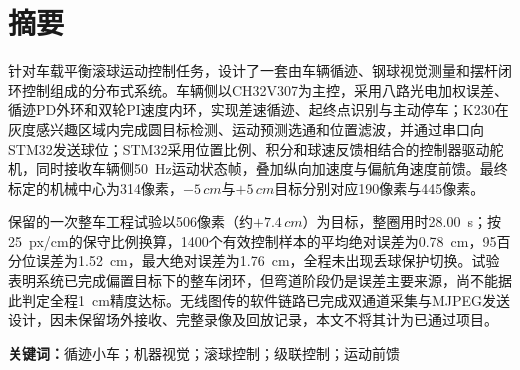 \section*{摘要}

\noindent
针对车载平衡滚球运动控制任务，设计了一套由车辆循迹、钢球视觉测量和摆杆闭环控制组成的分布式系统。车辆侧以CH32V307为主控，采用八路光电加权误差、循迹PD外环和双轮PI速度内环，实现差速循迹、起终点识别与主动停车；K230在灰度感兴趣区域内完成圆目标检测、运动预测选通和位置滤波，并通过串口向STM32发送球位；STM32采用位置比例、积分和球速反馈相结合的控制器驱动舵机，同时接收车辆侧\SI{50}{Hz}运动状态帧，叠加纵向加速度与偏航角速度前馈。最终标定的机械中心为314像素，$-5\,\si{cm}$与$+5\,\si{cm}$目标分别对应190像素与445像素。

保留的一次整车工程试验以506像素（约$+7.4\,\si{cm}$）为目标，整圈用时\SI{28.00}{s}；按\SI{25}{px/cm}的保守比例换算，1400个有效控制样本的平均绝对误差为\SI{0.78}{cm}，95百分位误差为\SI{1.52}{cm}，最大绝对误差为\SI{1.76}{cm}，全程未出现丢球保护切换。试验表明系统已完成偏置目标下的整车闭环，但弯道阶段仍是误差主要来源，尚不能据此判定全程\SI{1}{cm}精度达标。无线图传的软件链路已完成双通道采集与MJPEG发送设计，因未保留场外接收、完整录像及回放记录，本文不将其计为已通过项目。

\noindent\textbf{关键词：}循迹小车；机器视觉；滚球控制；级联控制；运动前馈
